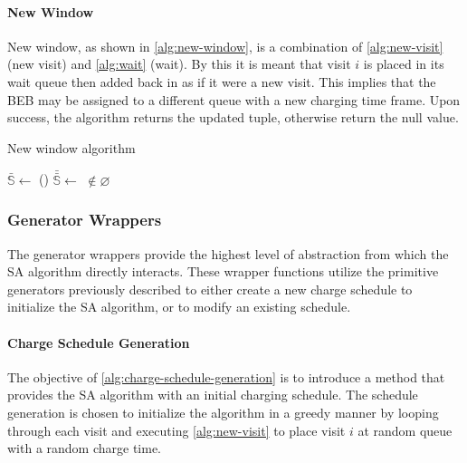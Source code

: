 \documentclass[energies,article,submit,moreauthors]{Definitions/mdpi}
\newcommand{\Sol}{\mathbb{S}}               %
\begin{document}
\paragraph{New Window}
\label{sec:sa-new-window}
New window, as shown in \ref{alg:new-window}, is a combination of \ref{alg:new-visit} (new visit) and \ref{alg:wait}
(wait). By this it is meant that visit \(i\) is placed in its wait queue then added back in as if it were a new visit.
This implies that the BEB may be assigned to a different queue with a new charging time frame. Upon success, the
algorithm returns the updated tuple, otherwise return the null value.

\begin{algorithm}[H]
  \scriptsize
  \caption{New window algorithm} \label{alg:new-window}
  \LinesNumbered
  \KwIn{$\Sol$}
  \KwOut{$\bar{\Sol}$}


  \Begin
  {
    $\bar{\Sol} \leftarrow$\Wait{$\Sol$}
    \If()
       {
         $\bar{\bar{\Sol}} \leftarrow$ \NewVisit{$\bar{\Sol}$} $\not\in \varnothing$
       }
       {
         \Return{$\bar{\bar{\Sol}}$} 
       }

       \Return{($\varnothing$)}
  }
\end{algorithm}

\subsubsection{Generator Wrappers}
\label{sec:sa-generator-wrappers}
The generator wrappers provide the highest level of abstraction from which the SA algorithm directly interacts. These
wrapper functions utilize the primitive generators previously described to either create a new charge schedule to
initialize the SA algorithm, or to modify an existing schedule.

\paragraph{Charge Schedule Generation}
\label{sec:sa-charge-schedule-generation}
The objective of \ref{alg:charge-schedule-generation} is to introduce a method that provides the SA algorithm with an
initial charging schedule. The schedule generation is chosen to initialize the algorithm in a greedy manner by looping
through each visit and executing \ref{alg:new-visit} to place visit \(i\) at random queue with a random charge time.
\end{document}
